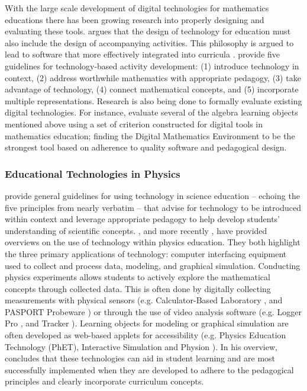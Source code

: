 \documentclass[11pt]{isuthesis}
\begin{document}
With the large scale development of digital technologies for mathematics educations there has been growing research into properly designing and evaluating these tools. \citet{drijvers2012digital} argues that the design of technology for education must also include the design of accompanying activities. This philosophy is argued to lead to software that more effectively integrated into curricula \citep{freiman2014technology}. \citet{stohl2000promoting} provide five guidelines for technology-based activity development: (1) introduce technology in context, (2) address worthwhile mathematics with appropriate pedagogy, (3) take advantage of technology, (4) connect mathematical concepts, and (5) incorporate multiple representations. Research is also being done to formally evaluate existing digital technologies. For instance, \citet{bokhove2010digital} evaluate several of the algebra learning objects mentioned above using a set of criterion constructed for digital tools in mathematics education; finding the Digital Mathematics Environment \citep{DME} to be the strongest tool based on adherence to quality software and pedagogical design. 

\subsubsection{Educational Technologies in Physics}
\label{EdTechPhysics}

\citet{flick2000preparing} provide general guidelines for using technology in science education -- echoing the five principles from \citet{stohl2000promoting} nearly verbatim -- that advise for technology to be introduced within context and leverage appropriate pedagogy to help develop students' understanding of scientific concepts. \citet{rios2000guide}, and more recently \citet{bryan2006technology}, have provided overviews on the use of technology within physics education. They both highlight the three primary applications of technology: computer interfacing equipment used to collect and process data, modeling, and graphical simulation. Conducting physics experiments allows students to actively explore the mathematical concepts through collected data. This is often done by digitally collecting measurements with physical sensors (e.g. Calculator-Based Laboratory \citep{cbl}, and PASPORT Probeware \citep{pasport}) or through the use of video analysis software (e.g. Logger Pro \citep{loggerpro}, and Tracker \citep{tracker}). Learning objects for modeling or graphical simulation are often developed as web-based applets for accessibility (e.g. Physics Education Technology (PhET), Interactive Simulation \citep{PhET} and Physion \citep{physion}). In his overview, \citet{bryan2006technology} concludes that these technologies can aid in student learning and are most successfully implemented when they are developed to adhere to the pedagogical principles and clearly incorporate curriculum concepts. 
\end{document}
